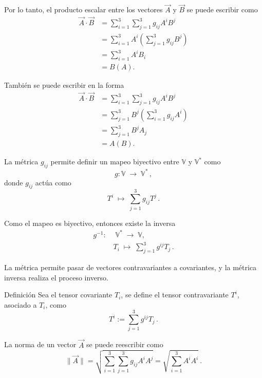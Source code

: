 \documentclass[../apunte_mecanica_clasica.tex]{subfiles}%
\begin{document}
Por lo tanto, el producto escalar entre los vectores $\vec{A}$ y $\vec{B}$ 
se puede escribir como
\begin{align*}
    \vec{A} \cdot \vec{B} 
    &= \sum_{i=1}^3 \sum_{j=1}^3 g_{ij} A^i B^j \\[6pt]
    &= \sum_{i=1}^3 A^i \left( \sum_{j=1}^3 g_{ij} B^j \right) \\[6pt]
    &= \sum_{i=1}^3 A^i B_i \\[6pt]
    &= B(A).
\end{align*}

También se puede escribir en la forma
\begin{align*}
    \vec{A} \cdot \vec{B} 
    &= \sum_{i=1}^3 \sum_{j=1}^3 g_{ij} A^i B^j \\[6pt]
    &= \sum_{j=1}^3 B^j \left( \sum_{i=1}^3 g_{ij} A^i \right) \\[6pt]
    &= \sum_{j=1}^3 B^j A_j \\[6pt]
    &= A(B).
\end{align*}

La métrica $g_{ij}$ permite definir un mapeo biyectivo entre 
$\mathbb{V}$ y $\mathbb{V}^*$ como
\begin{equation*}
    g : \mathbb{V} \;\longrightarrow\; \mathbb{V}^* \,,
\end{equation*}
donde $g_{ij}$ actúa como
\begin{equation*}
    T^i \;\longmapsto\; \sum_{j=1}^3 g_{ij} T^j \,.
\end{equation*}

Como el mapeo es biyectivo, entonces existe la inversa
\begin{align*}
    g^{-1} :&\; \mathbb{V}^* \;\longrightarrow\; \mathbb{V}, \\
    \qquad 
    &T_i \;\longmapsto\; \sum_{j=1}^3 g^{ij} T_j \,.
\end{align*}

La métrica permite pasar de vectores contravariantes a covariantes, 
y la métrica inversa realiza el proceso inverso.

\begin{apuntebloque}{Definición}
Sea el tensor covariante $T_i$, se define el tensor contravariante $T^i$, 
asociado a $T_i$, como
\begin{equation*}
    T^i := \sum_{j=1}^3 g^{ij} T_j \,.
\end{equation*}
\end{apuntebloque}

La norma de un vector $\vec{A}$ se puede reescribir como
\begin{equation*}
    \|\vec{A}\| 
    = \sqrt{\sum_{i=1}^3 \sum_{j=1}^3 g_{ij} A^i A^j} 
    = \sqrt{\sum_{i=1}^3 A^i A^i} \,.
\end{equation*}
\end{document}
